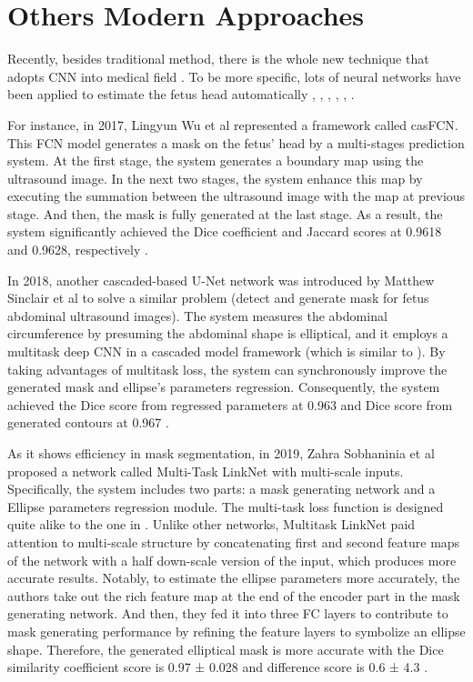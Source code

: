 \section{Others Modern Approaches}	
\label{secction:modern_appoarches}
\noindent
	
	Recently, besides traditional method, there is the whole new technique that adopts CNN into medical field \cite{litjens}. To be more specific, lots of neural networks have been applied to estimate the fetus head automatically \cite{mt_linknet}, \cite{casFCN}, \cite{casFCN_mtloss}, \cite{rueda}, \cite{shahin}, \cite{cerrolaza}.
	
	For instance, in 2017, Lingyun Wu et al represented a framework called casFCN. This FCN model generates a mask on the fetus' head by a multi-stages prediction system. At the first stage, the system generates a boundary map using the ultrasound image. In the next two stages, the system enhance this map by executing the summation between the ultrasound image with the map at previous stage. And then, the mask is fully generated at the last stage. As a result, the system significantly achieved the Dice coefficient and Jaccard scores at 0.9618 and 0.9628, respectively \cite{casFCN}.
	
	In 2018, another cascaded-based U-Net network \cite{unet} was introduced by Matthew Sinclair et al to solve a similar problem (detect and generate mask for fetus abdominal ultrasound images). The system measures the abdominal circumference by presuming the abdominal shape is elliptical, and it employs a multitask deep CNN in a cascaded model framework (which is similar to \cite{casFCN}). By taking advantages of multitask loss, the system can synchronously improve the generated mask and ellipse's parameters regression. Consequently, the system achieved the Dice score from regressed parameters at 0.963 and Dice score from generated contours at 0.967 \cite{casFCN_mtloss}.
	
	As it shows efficiency in mask segmentation, in 2019, Zahra Sobhaninia et al proposed a network called Multi-Task LinkNet with multi-scale inputs. Specifically, the system includes two parts: a mask generating network and a Ellipse parameters regression module. The multi-task loss function is designed quite alike to the one in \cite{casFCN_mtloss}. Unlike other networks, Multitask LinkNet paid attention to multi-scale structure by concatenating first and second feature maps of the network with a half down-scale version of the input, which produces more accurate results. Notably, to estimate the ellipse parameters more accurately, the authors take out the rich feature map at the end of the encoder part in the mask generating network. And then, they fed it into three FC layers to contribute to mask generating performance by refining the feature layers to symbolize an ellipse shape. Therefore, the generated elliptical mask is more accurate with the Dice similarity coefficient score is 0.97 ± 0.028 and difference score is 0.6 ± 4.3 \cite{mt_linknet}.


